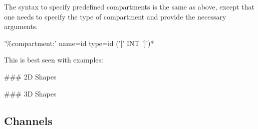 \documentclass[english]{report}
\def\todr#1{\todo[backgroundcolor=red!10, linecolor=red]{\sf #1}}
\begin{document}
The syntax to specify predefined compartments is the same as above, except that one needs to specify the type of compartment and provide the necessary arguments.
\begin{bnfsource}
'\%compartment:' name=id type=id ('[' INT ']')*
\end{bnfsource}
\newpage

This is best seen with examples:
\begin{kappasource}
### 2D Shapes


### 3D Shapes

\end{kappasource}



\subsection{Channels}\label{Chan}

\end{document}
